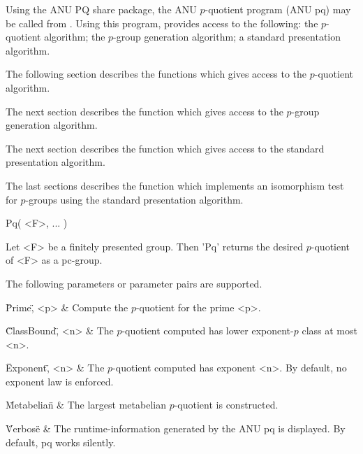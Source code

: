 


Using the ANU PQ share package, the ANU $p$-quotient program (ANU pq) may
be called from {\GAP}.  Using this program, {\GAP} provides access to the
following:   the  $p$-quotient   algorithm;   the  $p$-group   generation
algorithm; a standard presentation algorithm.

The following section  describes the functions which gives  access to the
$p$-quotient algorithm.

The  next  section describes  the  function  which  gives access  to  the
$p$-group generation algorithm.

The  next  section describes  the  function  which  gives access  to  the
standard presentation algorithm.

The last sections describes  the function which implements an isomorphism
test for $p$-groups using the standard presentation algorithm.


\>Pq( <F>, ... )

Let <F> be a  finitely presented  group.  Then  'Pq' returns  the desired
$p$-quotient of <F> as a pc-group.

The following parameters or parameter pairs are supported.

\beginitems
\"Prime\", <p> & 
    Compute the $p$-quotient for the prime <p>.

\"ClassBound\", <n> & 
    The $p$-quotient computed has lower exponent-$p$ class at most <n>.    

\"Exponent\", <n> & 
    The $p$-quotient computed has exponent <n>. By default, no
    exponent law is enforced. 

\"Metabelian\" & 
    The largest metabelian $p$-quotient is constructed. 

\"Verbose\" &
    The runtime-information generated  by  the ANU  pq is  displayed.  By
    default, pq works silently.

